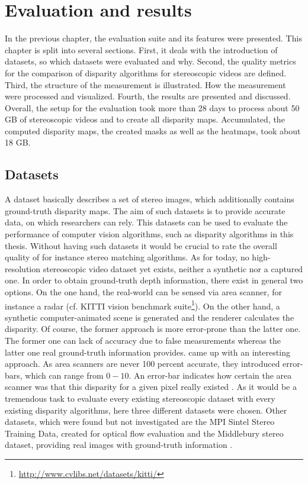 \chapter{Evaluation and results}
\label{chap:eval}

In the previous chapter, the evaluation suite and its features were presented.
This chapter is split into several sections.
First, it deals with the introduction of datasets, so which datasets were evaluated and why.
Second, the quality metrics for the comparison of disparity algorithms for stereoscopic videos are defined.
Third, the structure of the measurement is illustrated.
How the measurement were processed and visualized.
Fourth, the results are presented and discussed.
\newline\newline\noindent Overall, the setup for the evaluation took more than 28 days to process about 50 GB of stereoscopic videos and to create all disparity maps.
Accumulated, the computed disparity maps, the created masks as well as the heatmaps, took about 18 GB.

\section{Datasets}

A dataset basically describes a set of stereo images, which additionally contains ground-truth disparity maps.
The aim of such datasets is to provide accurate data, on which researchers can rely.
This datasets can be used to evaluate the performance of computer vision algorithms, such as disparity algorithms in this thesis.
Without having such datasets it would be crucial to rate the overall quality of for instance stereo matching algorithms.
As for today, no high-resolution stereoscopic video dataset yet exists, neither a synthetic nor a captured one.
In order to obtain ground-truth depth information, there exist in general two options.
On the one hand, the real-world can be sensed via area scanner, for instance a radar (cf. KITTI vision benchmark suite\footnote{\url{http://www.cvlibs.net/datasets/kitti/}}).
On the other hand, a synthetic computer-animated scene is generated and the renderer calculates the disparity.
Of course, the former approach is more error-prone than the latter one.
The former one can lack of accuracy due to false measurements whereas the latter one real ground-truth information provides.
\newline\newline\noindent \citeauthor{kondermann2015stereo} came up with an interesting approach.
As area scanners are never 100 percent accurate, they introduced error-bars, which can range from $0-10$.
An error-bar indicates how certain the area scanner was that this disparity for a given pixel really existed \citep{kondermann2015stereo}.
As it would be a tremendous task to evaluate every existing stereoscopic dataset with every existing disparity algorithms, here three different datasets were chosen.
Other datasets, which were found but not investigated are the MPI Sintel Stereo Training Data, created for optical flow evaluation \citep{Butler:ECCV:2012} and the Middlebury stereo dataset, providing real images with ground-truth information \citep{scharstein2006middlebury}.

